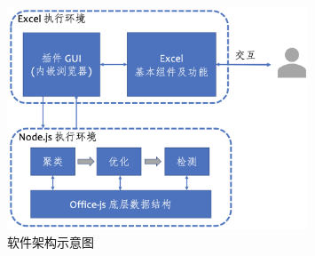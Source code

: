 \begin{figure}[tp]   
    \centering
    \includegraphics[width=0.8\textwidth]{figure/eg/eguard-framework.png}
    \caption{\eg 软件架构示意图}
    \label{figure-eg-framework}
\end{figure}